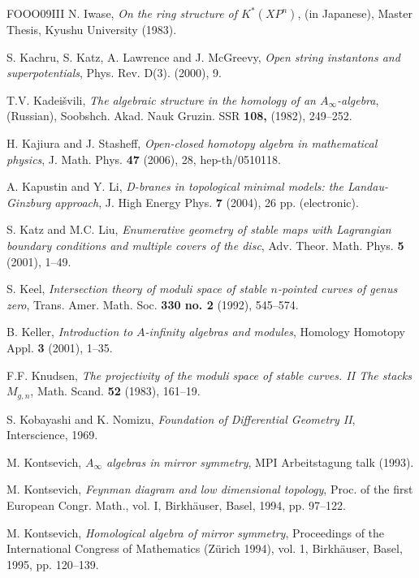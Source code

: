 \begin{thebibliography}{FOOO09III}
 N. Iwase, \emph{On the ring structure of \(K^*(XP^n)\)}, (in Japanese), Master Thesis, Kyushu University (1983).

 S. Kachru, S. Katz, A. Lawrence and J. McGreevy, \emph{Open string instantons and superpotentials}, Phys. Rev. D(3). (2000), 9.

 T.V. Kadeišvili, \emph{The algebraic structure in the homology of an \(A_\infty\)-algebra}, (Russian), Soobshch. Akad. Nauk Gruzin. SSR \textbf{108,} (1982), 249–252.

 H. Kajiura and J. Stasheff, \emph{Open-closed homotopy algebra in mathematical physics}, J. Math. Phys. \textbf{47} (2006), 28, hep-th/0510118.

 A. Kapustin and Y. Li, \emph{D-branes in topological minimal models: the Landau-Ginzburg approach}, J. High Energy Phys. \textbf{7} (2004), 26 pp. (electronic).

 S. Katz and M.C. Liu, \emph{Enumerative geometry of stable maps with Lagrangian boundary conditions and multiple covers of the disc}, Adv. Theor. Math. Phys. \textbf{5} (2001), 1–49.

 S. Keel, \emph{Intersection theory of moduli space of stable \(n\)-pointed curves of genus zero}, Trans. Amer. Math. Soc. \textbf{330 no. 2} (1992), 545–574.

 B. Keller, \emph{Introduction to \(A\)-infinity algebras and modules}, Homology Homotopy Appl. \textbf{3} (2001), 1–35.

 F.F. Knudsen, \emph{The projectivity of the moduli space of stable curves. II The stacks \(M_{g,n}\)}, Math. Scand. \textbf{52} (1983), 161–19.

 S. Kobayashi and K. Nomizu, \emph{Foundation of Differential Geometry II}, Interscience, 1969.

 M. Kontsevich, \emph{\(A_\infty\) algebras in mirror symmetry}, MPI Arbeitstagung talk (1993).

 M. Kontsevich, \emph{Feynman diagram and low dimensional topology}, Proc. of the first European Congr. Math., vol. I, Birkhäuser, Basel, 1994, pp. 97–122.

 M. Kontsevich, \emph{Homological algebra of mirror symmetry}, Proceedings of the International Congress of Mathematics (Zürich 1994), vol. 1, Birkhäuser, Basel, 1995, pp. 120–139.


\end{thebibliography}
